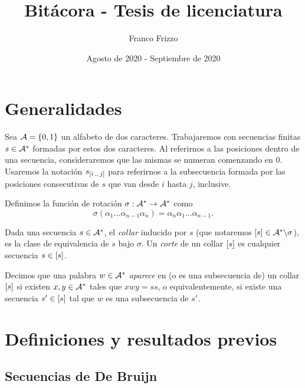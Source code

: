 \documentclass[11pt]{article}
\newcommand\myauthor{Franco Frizzo}
\newcommand\mytitle{Bitácora - Tesis de licenciatura}
\newcommand\mydate{Agosto de 2020 - Septiembre de 2020}
\begin{document}
\title{\mytitle}
\author{\myauthor}
\date{\mydate}

\maketitle
\tableofcontents
\newpage

\section{Generalidades}

Sea $\mathcal{A} = \lbrace0, 1\rbrace$ un alfabeto de dos caracteres.
Trabajaremos con secuencias finitas $s \in \mathcal{A}^*$ formadas por estos dos
caracteres. Al referirnos a las posiciones dentro de una secuencia,
consideraremos que las mismas se numeran comenzando en $0$. Usaremos la
notación $s_{[i\,..\,j]}$ para referirnos a la subsecuencia formada por las
posiciones consecutivas de $s$ que van desde $i$ hasta $j$, inclusive.

\begin{definition}
	Definimos la función de rotación $\sigma: \mathcal{A}^* \to \mathcal{A}^*$ como
	\[ \sigma(\alpha_1\dots\alpha_{n-1}\alpha_n) =
		\alpha_n\alpha_1\dots\alpha_{n-1}. \]
\end{definition}

\begin{definition}
	Dada una secuencia $s \in \mathcal{A}^*$, el \emph{collar} inducido por $s$
	(que notaremos $\left[s\right] \in \mathcal{A}^*\backslash\sigma$), es la clase de
	equivalencia de $s$ bajo $\sigma$. Un \emph{corte} de un collar $\left[s\right]$
	es cualquier secuencia $s \in \left[s\right]$.
\end{definition}

\begin{definition}

	Decimos que una palabra $w \in \mathcal{A}^*$ \emph{aparece} en (o es una
	subsecuencia de) un collar $\left[s\right]$ si existen $x, y \in \mathcal{A}^*$ tales
	que $xwy = ss$, o equivalentemente, si existe una secuencia $s' \in \left[s\right]$
	tal que $w$ es una subsecuencia de $s'$.
\end{definition}

\section{Definiciones y resultados previos}

\subsection{Secuencias de De Bruijn}
\end{document}
